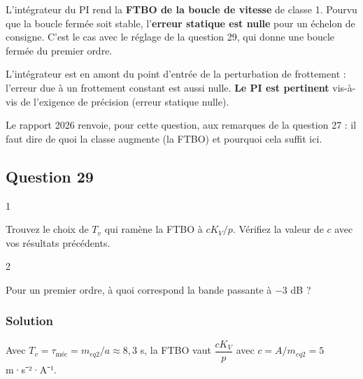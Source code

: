 \documentclass[11pt,a4paper]{article}
\newcommand{\equationajustee}[1]{%
  \sbox{\boiteequation}{$\displaystyle #1$}%
  \ifdim\wd\boiteequation>\linewidth
    \[\resizebox{\linewidth}{!}{\usebox{\boiteequation}}\]%
  \else
    \[#1\]%
  \fi}
\begin{document}
L'intégrateur du PI rend la \textbf{FTBO de la boucle de vitesse} de classe 1. Pourvu que la boucle fermée soit stable, l'\textbf{erreur statique est nulle} pour un échelon de consigne. C'est le cas avec le réglage de la question 29, qui donne une boucle fermée du premier ordre.

L'intégrateur est en amont du point d'entrée de la perturbation de frottement : l'erreur due à un frottement constant est aussi nulle. \textbf{Le PI est pertinent} vis-à-vis de l'exigence de précision (erreur statique nulle).

\begin{jury}

Le rapport 2026 renvoie, pour cette question, aux remarques de la question 27 : il faut dire de quoi la classe augmente (la FTBO) et pourquoi cela suffit ici.

\end{jury}

\hypertarget{question-29}{%
\subsection{Question 29}\label{question-29}}

\begin{indication}{1}

Trouvez le choix de \(T_v\) qui ramène la FTBO à \(cK_V/p\). Vérifiez la valeur de \(c\) avec vos résultats précédents.

\end{indication}

\begin{indication}{2}

Pour un premier ordre, à quoi correspond la bande passante à \(-3\) dB ?

\end{indication}

\hypertarget{solution-28}{%
\subsubsection{Solution}\label{solution-28}}

Avec \(T_v = \tau_{\text{méc}} = m_{eq2}/a\approx 8{,}3\) s, la FTBO vaut \(\dfrac{cK_V}{p}\) avec \(c = A/m_{eq2} = 5\) m·s⁻²·A⁻¹.

\equationajustee{\frac{V}{V_C} = \frac{1}{1 + \frac{p}{cK_V}}}

\equationajustee{\boxed{K_X = 1}}

\equationajustee{\boxed{\tau_X = \frac{1}{cK_V}}}
\end{document}
